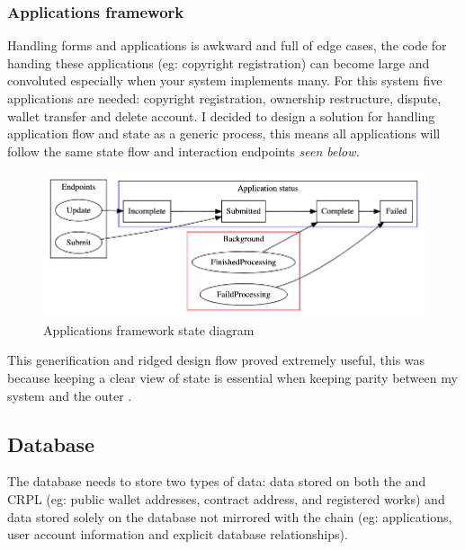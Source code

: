 \subsubsection{Applications framework}
\label{sec:application-framework-design}

Handling forms and applications is awkward and full of edge cases, the code for handing these applications (eg: copyright registration) can become large and convoluted especially when your system implements many. For this system five applications are needed: copyright registration, ownership restructure, dispute, wallet transfer and delete account. I decided to design a solution for handling application flow and state as a generic process, this means all applications will follow the same state flow and interaction endpoints \textit{seen below.} 

\begin{figure}[H]
\caption{Applications framework state diagram}
\centering
\includegraphics[width=\textwidth,height=0.5\textheight,keepaspectratio]{images/operational/applications-status}
\end{figure}

This generification and ridged design flow proved extremely useful, this was because keeping a clear view of state is essential when keeping parity between my system and the outer .

\subsection{Database}

The database needs to store two types of data: data stored on both the  and CRPL (eg: public wallet addresses, contract address, and registered works) and data stored solely on the database not mirrored with the chain (eg: applications, user account information and explicit database relationships).

